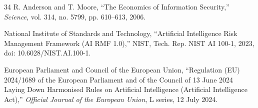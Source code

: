 \begin{thebibliography}{34}
R. Anderson and T. Moore, ``The Economics of Information Security,'' \emph{Science},
vol. 314, no. 5799, pp. 610--613, 2006.

National Institute of Standards and Technology, ``Artificial Intelligence
Risk Management Framework (AI RMF 1.0),'' NIST, Tech. Rep. NIST AI 100-1,
2023, doi: 10.6028/NIST.AI.100-1.

European Parliament and Council of the European Union, ``Regulation (EU)
2024/1689 of the European Parliament and of the Council of 13 June 2024
Laying Down Harmonised Rules on Artificial Intelligence (Artificial
Intelligence Act),'' \emph{Official Journal of the European Union}, L series,
12 July 2024.


\end{thebibliography}
